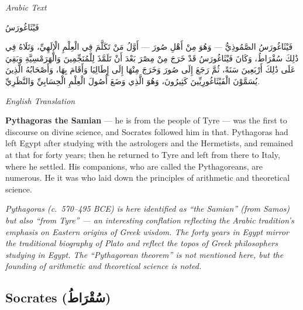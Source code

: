 \documentclass[11pt,a4paper]{article}
\def\RL#1{\beginR#1\endR}
\newcommand{\cnote}[1]{\textcolor{notecolor}{\textit{#1}}}
\newcommand{\textarabic}[1]{{\arabicfont\RL{#1}}}
\newenvironment{arabiccol}{%
  \begin{minipage}[t]{0.48\textwidth}%
  \begin{tcolorbox}[colback=leftbg,colframe=rulecolor,boxrule=0.4pt,arc=2pt,left=5pt,right=5pt,top=5pt,bottom=5pt]%
  \centering\textit{\footnotesize Arabic Text}\\[0.4em]%
  \raggedright\arabicfont\small%
}{%
  \end{tcolorbox}%
  \end{minipage}%
}
\newenvironment{englishcol}{%
  \begin{minipage}[t]{0.48\textwidth}%
  \begin{tcolorbox}[colback=rightbg,colframe=rulecolor,boxrule=0.4pt,arc=2pt,left=5pt,right=5pt,top=5pt,bottom=5pt]%
  \centering\textit{\footnotesize English Translation}\\[0.4em]%
  \raggedright\small%
}{%
  \end{tcolorbox}%
  \end{minipage}%
}
\begin{document}
\noindent
\begin{arabiccol}
\beginR
فَيْثَاغُورَسُ

فَيْثَاغُورَسُ الصَّمُوذِيُّ — وَهُوَ مِنْ أَهْلِ صُورَ — أَوَّلُ مَنْ تَكَلَّمَ فِي الْعِلْمِ الْإِلَهِيِّ، وَتَلَاهُ فِي ذَٰلِكَ سُقْرَاطُ، وَكَانَ فَيْثَاغُورَسُ قَدْ خَرَجَ مِنْ مِصْرَ بَعْدَ أَنْ تَلَمَّذَ لِلْمُنَجِّمِينَ وَالْهَرَمْسِيَّةِ وَبَقِيَ عَلَى ذَٰلِكَ أَرْبَعِينَ سَنَةً، ثُمَّ رَجَعَ إِلَى صُورَ وَخَرَجَ مِنْهَا إِلَى إِطَالِيَا وَأَقَامَ بِهَا، وَأَصْحَابُهُ الَّذِينَ يُسَمَّوْنَ الْفَيْثَاغُورِيِّينَ كَثِيرُونَ، وَهُوَ الَّذِي وَضَعَ أُصُولَ الْعِلْمِ الْحِسَابِيِّ وَالنَّظَرِيِّ.
\endR
\end{arabiccol}
\hfill
\begin{englishcol}
\textbf{Pythagoras the Samian} --- he is from the people of Tyre --- was the first to discourse on divine science, and Socrates followed him in that. Pythagoras had left Egypt after studying with the astrologers and the Hermetists, and remained at that for forty years; then he returned to Tyre and left from there to Italy, where he settled. His companions, who are called the Pythagoreans, are numerous. He it was who laid down the principles of arithmetic and theoretical science.

\cnote{Pythagoras (c.~570--495 BCE) is here identified as ``the Samian'' (from Samos) but also ``from Tyre'' --- an interesting conflation reflecting the Arabic tradition's emphasis on Eastern origins of Greek wisdom. The forty years in Egypt mirror the traditional biography of Plato and reflect the topos of Greek philosophers studying in Egypt. The ``Pythagorean theorem'' is not mentioned here, but the founding of arithmetic and theoretical science is noted.}
\end{englishcol}

\par\vspace{0.5em}

\subsection{Socrates (\textarabic{سُقْرَاطُ})}
\end{document}
